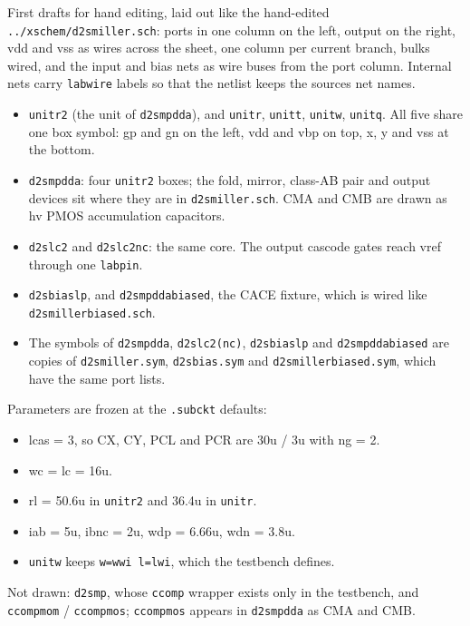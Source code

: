 \documentclass[11pt,a4paper]{article}
\providecommand{\tightlist}{\setlength{\itemsep}{0pt}\setlength{\parskip}{0pt}}
\renewcommand{\_}{\textunderscore\hspace{0pt}}
\begin{document}
First drafts for hand editing, laid out like the
hand-edited \texttt{../xschem/d2s\_miller.sch}:
ports in one column on the left, output on the
right, vdd and vss as wires across the sheet, one
column per current branch, bulks wired, and the
input and bias nets as wire buses from the port
column. Internal nets carry \texttt{lab\_wire}
labels so that the netlist keeps the
source\textquotesingle s net names.

\begin{itemize}
\tightlist
\item
  \texttt{unit\_r2} (the unit of
  \texttt{d2s\_mpdda}), and \texttt{unit\_r},
  \texttt{unit\_t}, \texttt{unit\_w},
  \texttt{unit\_q}. All five share one box symbol:
  gp and gn on the left, vdd and vbp on top, x, y
  and vss at the bottom.
\item
  \texttt{d2s\_mpdda}: four \texttt{unit\_r2}
  boxes; the fold, mirror, class-AB pair and
  output devices sit where they are in
  \texttt{d2s\_miller.sch}. CMA and CMB are drawn
  as hv PMOS accumulation capacitors.
\item
  \texttt{d2s\_lc2} and \texttt{d2s\_lc2\_nc}: the
  same core. The output cascode gates reach vref
  through one \texttt{lab\_pin}.
\item
  \texttt{d2s\_bias\_lp}, and
  \texttt{d2s\_mpdda\_biased}, the CACE fixture,
  which is wired like
  \texttt{d2s\_miller\_biased.sch}.
\item
  The symbols of \texttt{d2s\_mpdda},
  \texttt{d2s\_lc2(\_nc)}, \texttt{d2s\_bias\_lp}
  and \texttt{d2s\_mpdda\_biased} are copies of
  \texttt{d2s\_miller.sym}, \texttt{d2s\_bias.sym}
  and \texttt{d2s\_miller\_biased.sym}, which have
  the same port lists.
\end{itemize}

Parameters are frozen at the \texttt{.subckt}
defaults:

\begin{itemize}
\tightlist
\item
  lcas = 3, so CX, CY, PCL and PCR are 30u / 3u
  with ng = 2.
\item
  wc = lc = 16u.
\item
  rl = 50.6u in \texttt{unit\_r2} and 36.4u in
  \texttt{unit\_r}.
\item
  iab = 5u, ibnc = 2u, wdp = 6.66u, wdn = 3.8u.
\item
  \texttt{unit\_w} keeps \texttt{w=wwi\ l=lwi},
  which the testbench defines.
\end{itemize}

Not drawn: \texttt{d2s\_mp}, whose \texttt{ccomp}
wrapper exists only in the testbench, and
\texttt{ccomp\_mom} / \texttt{ccomp\_mos};
\texttt{ccomp\_mos} appears in \texttt{d2s\_mpdda}
as CMA and CMB.
\end{document}
